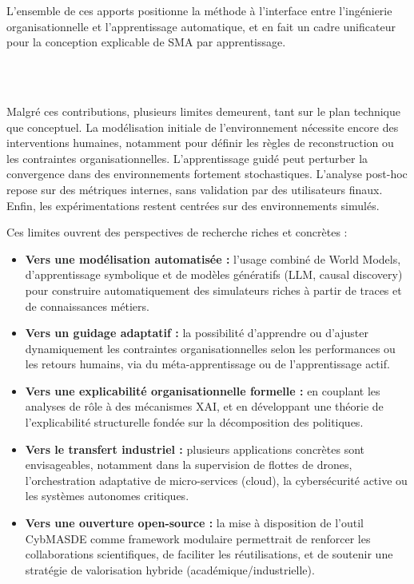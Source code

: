 L’ensemble de ces apports positionne la méthode à l’interface entre l’ingénierie organisationnelle et l’apprentissage automatique, et en fait un cadre unificateur pour la conception explicable de SMA par apprentissage.


\

\bigskip

\\

\noindent
Malgré ces contributions, plusieurs limites demeurent, tant sur le plan technique que conceptuel. La modélisation initiale de l’environnement nécessite encore des interventions humaines, notamment pour définir les règles de reconstruction ou les contraintes organisationnelles. L’apprentissage guidé peut perturber la convergence dans des environnements fortement stochastiques. L’analyse post-hoc repose sur des métriques internes, sans validation par des utilisateurs finaux. Enfin, les expérimentations restent centrées sur des environnements simulés.

Ces limites ouvrent des perspectives de recherche riches et concrètes :

\begin{itemize}
  \item \textbf{Vers une modélisation automatisée :} l’usage combiné de World Models, d’apprentissage symbolique et de modèles génératifs (LLM, causal discovery) pour construire automatiquement des simulateurs riches à partir de traces et de connaissances métiers.

  \item \textbf{Vers un guidage adaptatif :} la possibilité d’apprendre ou d’ajuster dynamiquement les contraintes organisationnelles selon les performances ou les retours humains, via du méta-apprentissage ou de l’apprentissage actif.

  \item \textbf{Vers une explicabilité organisationnelle formelle :} en couplant les analyses de rôle à des mécanismes XAI, et en développant une théorie de l’explicabilité structurelle fondée sur la décomposition des politiques.

  \item \textbf{Vers le transfert industriel :} plusieurs applications concrètes sont envisageables, notamment dans la supervision de flottes de drones, l’orchestration adaptative de micro-services (cloud), la cybersécurité active ou les systèmes autonomes critiques.

  \item \textbf{Vers une ouverture open-source :} la mise à disposition de l’outil CybMASDE comme framework modulaire permettrait de renforcer les collaborations scientifiques, de faciliter les réutilisations, et de soutenir une stratégie de valorisation hybride (académique/industrielle).
\end{itemize}

